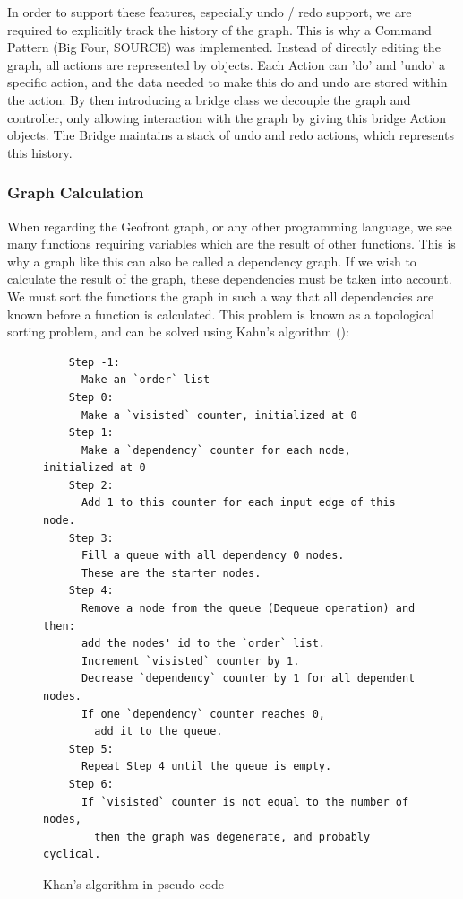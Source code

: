 In order to support these features, especially undo / redo support, we are required to explicitly track the history of the graph. 
This is why a Command Pattern (Big Four, SOURCE) was implemented.
Instead of directly editing the graph, all actions are represented by  objects. 
Each Action can 'do' and 'undo' a specific action, and the data needed to make this do and undo are stored within the action. 
By then introducing a bridge class we decouple the graph and controller, only allowing interaction with the graph by giving this bridge Action objects. The Bridge maintains a stack of undo and redo actions, which represents this history.  


\subsubsection*{Graph Calculation}

When regarding the Geofront graph, or any other programming language, we see many functions requiring variables which are the result of other functions. 
This is why a graph like this can also be called a dependency graph. 
If we wish to calculate the result of the graph, these dependencies must be taken into account. 
We must sort the functions the graph in such a way that all dependencies are known before a function is calculated.
This problem is known as a topological sorting problem, and can be solved using Kahn's algorithm (): 

\begin{figure}
  \centering
  \begin{lstlisting}
    Step -1: 
      Make an `order` list
    Step 0: 
      Make a `visisted` counter, initialized at 0
    Step 1: 
      Make a `dependency` counter for each node, initialized at 0
    Step 2: 
      Add 1 to this counter for each input edge of this node.
    Step 3: 
      Fill a queue with all dependency 0 nodes. 
      These are the starter nodes.
    Step 4: 
      Remove a node from the queue (Dequeue operation) and then:
      add the nodes' id to the `order` list.
      Increment `visisted` counter by 1.
      Decrease `dependency` counter by 1 for all dependent nodes.
      If one `dependency` counter reaches 0, 
        add it to the queue.
    Step 5: 
      Repeat Step 4 until the queue is empty.
    Step 6: 
      If `visisted` counter is not equal to the number of nodes, 
        then the graph was degenerate, and probably cyclical. 
    \end{lstlisting}
  \caption[Kahns algorithm]{Khan's algorithm in pseudo code}
  \label{fig:kahn}
\end{figure}

